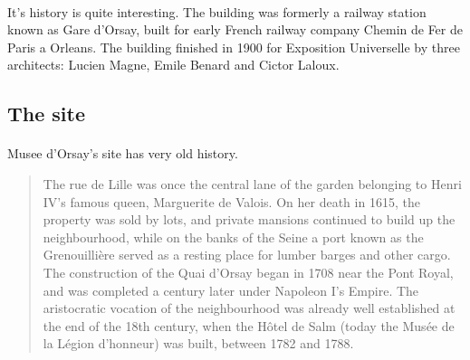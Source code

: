 \documentclass[
10pt, %
a4paper, %
oneside, %
headinclude,footinclude, %
BCOR5mm, %
]{scrartcl}
\theoremstyle{definition} %
\theoremstyle{plain} %
\theoremstyle{remark} %
\begin{document}
\paragraph{} It's history is quite interesting. The building was formerly a railway station known as Gare d'Orsay, built for early French railway company Chemin de Fer de Paris a Orleans. The building finished in 1900 for Exposition Universelle by three architects: Lucien Magne, Emile Benard and Cictor Laloux.




\subsection{The site}
\paragraph{}Musee d'Orsay's site has very old history.
\begin{quote}
The rue de Lille was once the central lane of the garden belonging to Henri IV's famous queen, Marguerite de Valois. On her death in 1615, the property was sold by lots, and private mansions continued to build up the neighbourhood, while on the banks of the Seine a port known as the Grenouillière served as a resting place for lumber barges and other cargo. The construction of the Quai d'Orsay began in 1708 near the Pont Royal, and was completed a century later under Napoleon I's Empire. The aristocratic vocation of the neighbourhood was already well established at the end of the 18th century, when the Hôtel de Salm (today the Musée de la Légion d'honneur) was built, between 1782 and 1788.
\cite{orsayMuseumHistory}
\end{quote}
\end{document}
